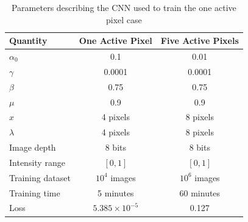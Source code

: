 \documentclass[twoside]{article}
\begin{document}
\begin{multicols}{2}
\begin{table}
\centering
\begin{tabular}{|l|c|c|}
\hline
Quantity & One Active Pixel & Five Active Pixels \\ \hline
$\alpha_0$ & 0.1 & 0.01\\ \hline
$\gamma$ & 0.0001 & 0.0001\\ \hline
$\beta$ & 0.75 & 0.75 \\ \hline
$\mu$ & 0.9 & 0.9\\ \hline
$x$ & 4 pixels & 8 pixels\\ \hline
$\lambda$  & 4 pixels & 8 pixels\\ \hline
Image depth & 8 bits & 8 bits\\ \hline
Intensity range & $[0,1]$  & $[0,1]$\\ \hline
Training dataset & $10^4$ images & $10^6$ images\\ \hline
Training time &  5 minutes & 60 minutes\\ \hline
Loss & $5.385\times10^{-5}$ & 0.127\\ \hline
\end{tabular}
\caption{Parameters describing the CNN used to train the one active pixel case}
\label{4x4tab}
\end{table}
\begin{figure}
\centering
\begin{subfigure}[b]{0.42\textwidth}  

\end{subfigure}
\end{figure}
\end{multicols}
\end{document}
